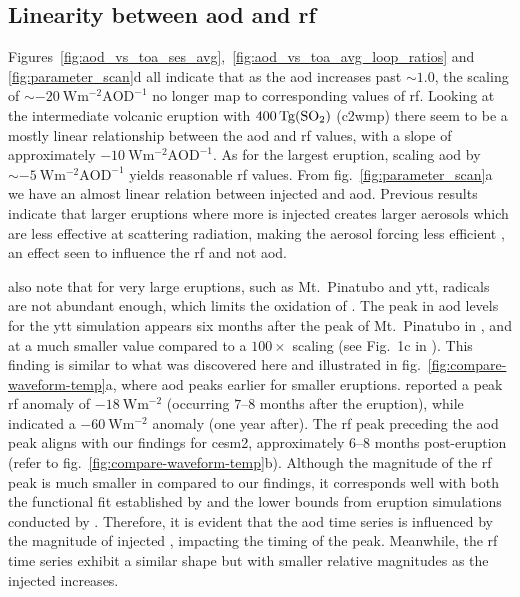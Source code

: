 \documentclass{ametsocV6.1}
\newcommand{\iso}[1][i]{{#1}njected \ce{SO2}}
\begin{document}
\subsection{Linearity between \gls{aod} and \gls{rf}}

Figures~\ref{fig:aod_vs_toa_ses_avg},~\ref{fig:aod_vs_toa_avg_loop_ratios} and
\ref{fig:parameter_scan}d all indicate that as the \gls{aod} increases past \(\sim
1.0\), the scaling of \(\sim \SI{-20}{\watt\metre^{-2}\mathrm{AOD}^{-1}}\) no longer map
to corresponding values of \gls{rf}. Looking at the intermediate volcanic eruption with
\(\SI{400}{\tera\gram(\ce{SO2})}\) (\gls{c2wmp}) there seem to be a mostly linear
relationship between the \gls{aod} and \gls{rf} values, with a slope of approximately
\(\SI{-10}{\watt\metre^{-2}\mathrm{AOD}^{-1}}\). As for the largest eruption, scaling
\gls{aod} by \(\sim \SI{-5}{\watt\metre^{-2}\mathrm{AOD}^{-1}}\) yields reasonable
\gls{rf} values. From fig.~\ref{fig:parameter_scan}a we have an almost linear relation
between \iso{} and \gls{aod}. Previous results indicate that larger eruptions where more
 is injected creates larger aerosols which are less effective at scattering
radiation, making the aerosol forcing less efficient
\citep{english2013,timmreck2010,timmreck2018}, an effect seen to influence the \gls{rf}
and not \gls{aod}.

\citet{timmreck2010} also note that for very large eruptions, such as Mt.\ Pinatubo and
\gls{ytt},  radicals are not abundant enough, which limits the oxidation of
. The peak in \gls{aod} levels for the \gls{ytt} simulation appears six months
after the peak of Mt.\ Pinatubo in \citet{timmreck2010}, and at a much smaller value
compared to a \(100\times\) scaling (see Fig.\ 1c in \citet{timmreck2010}). This finding
is similar to what was discovered here and illustrated in
fig.~\ref{fig:compare-waveform-temp}a, where \gls{aod} peaks earlier for smaller
eruptions. \citet{timmreck2010} reported a peak \gls{rf} anomaly of
\(\SI{-18}{\watt\metre^{-2}}\) (occurring \(7\)--\(8\) months after the eruption), while
\citet{jones2005} indicated a \(\SI{-60}{\watt\metre^{-2}}\) anomaly (one year after).
The \gls{rf} peak preceding the \gls{aod} peak aligns with our findings for \gls{cesm2},
approximately \(6\)--\(8\) months post-eruption (refer to
fig.~\ref{fig:compare-waveform-temp}b). Although the magnitude of the \gls{rf} peak is
much smaller in \citet{timmreck2010} compared to our findings, it corresponds well with
both the functional fit established by \citet{niemeier2015} and the lower bounds from
eruption simulations conducted by \citet{marshall2020}. Therefore, it is evident that
the \gls{aod} time series is influenced by the magnitude of \iso{}, impacting the timing
of the peak. Meanwhile, the \gls{rf} time series exhibit a similar shape but with
smaller relative magnitudes as the \iso{} increases.
\end{document}
